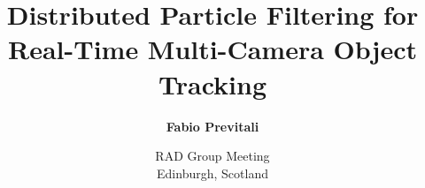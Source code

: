 \documentclass{beamer}
\title[Distributed Particle Filtering for Real-Time Multi-Camera Object Tracking]{\Large Distributed Particle Filtering for Real-Time Multi-Camera Object Tracking}
\subtitle{}
\author[Fabio Previtali]{\Large\textbf{Fabio Previtali}}
\date[September 8, 2014]{RAD Group Meeting\\Edinburgh, Scotland}
\begin{document}
\begin{frame}[plain]
	\titlepage
\end{frame}







\tiny


\end{document}
